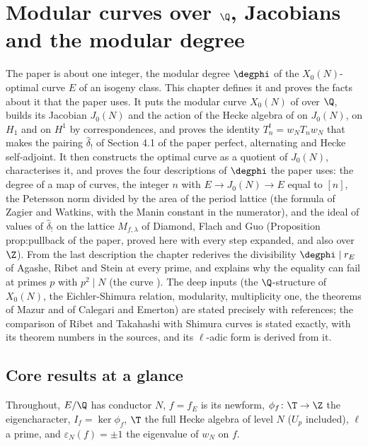 \chapter{Modular curves over \texorpdfstring{$\Q$}{Q}, Jacobians and the modular degree}\label{ch:moddeg}

The paper is about one integer, the modular degree $\degphi$ of the $X_0(N)$-optimal curve $E$ of an isogeny class. This
chapter defines it and proves the facts about it that the paper uses. It puts the modular curve $X_0(N)$ of 
over $\Q$, builds its Jacobian $J_0(N)$ and the action of the Hecke algebra of  on $J_0(N)$, on $H_1$ and on $H^1$ by
correspondences, and proves the identity $T_n^t=w_NT_nw_N$ that makes the pairing $\hat\delta_!$ of Section 4.1 of the paper
perfect, alternating and Hecke self-adjoint. It then constructs the optimal curve as a quotient of $J_0(N)$, characterises it,
and proves the four descriptions of $\degphi$ the paper uses: the degree of a map of curves, the integer $n$ with
$E\to J_0(N)\to E$ equal to $[n]$, the Petersson norm divided by the area of the period lattice (the formula of Zagier and
Watkins, with the Manin constant in the numerator), and the ideal of values of $\hat\delta_!$ on the lattice $M_{f,\lambda}$ of
Diamond, Flach and Guo (Proposition prop:pullback of the paper, proved here with every step expanded, and also over $\Z$). From the
last description the chapter rederives the divisibility $\degphi\mid r_E$ of Agashe, Ribet and Stein at every prime, and explains why the
equality can fail at primes $p$ with $p^2\mid N$ (the curve ). The deep inputs (the $\Q$-structure of $X_0(N)$, the
Eichler-Shimura relation, modularity, multiplicity one, the theorems of Mazur and of Calegari and Emerton) are stated precisely with
references; the comparison of Ribet and Takahashi with Shimura curves is stated exactly, with its theorem numbers in the sources, and its
$\ell$-adic form is derived from it.

\section*{Core results at a glance}

Throughout, $E/\Q$ has conductor $N$, $f=f_E$ is its newform, $\phi_f\colon\T\to\Z$ the eigencharacter, $I_f=\ker\phi_f$, $\T$ the full Hecke algebra of level $N$ ($U_p$ included), $\ell$ a prime, and
$\varepsilon_N(f)=\pm1$ the eigenvalue of $w_N$ on $f$.

